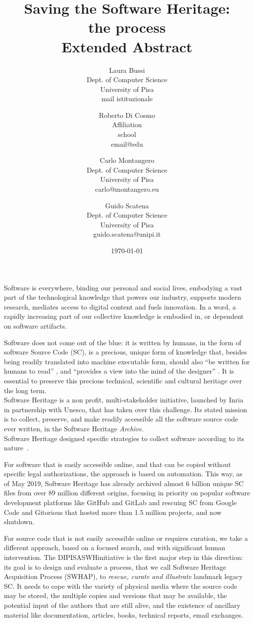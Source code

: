 \documentclass[a4paper]{article}
\title{Saving the Software Heritage:
				\\ the process  
				\\ 	\large Extended Abstract
}
\author{
    Laura Bussi\\
    Dept. of Computer Science\\
    University of Pisa\\
    mail istituzionale
	\and
    Roberto Di Cosmo\\
    Affiliation\\
    school\\
    email@edu
  \and
    Carlo Montangero\\
    Dept. of Computer Science\\
    University of Pisa\\
    carlo@montangero.eu
  \and
    Guido Scatena\\
		Dept. of Computer Science\\
    University of Pisa\\
    guido.scatena@unipi.it
}
\date{\today}
\newcommand{\DIPISASWHinitiative}{DIPISASWHinitiative }
\begin{document}
\maketitle

\noindent              
Software is everywhere,  binding our personal and social lives, embodying a vast part of the technological knowledge that powers our industry, supports modern research, mediates access to digital content and fuels innovation. In a word, a rapidly increasing part of our collective knowledge is embodied in, or dependent on software artifacts. 

Software does not come out of the blue: it is written by humans, in the form of software Source Code (SC), is a precious, unique form of knowledge that, besides being readily translated into machine executable form, should also "`be written for humans to read"' \cite{AbelsonS85}, and "`provides a view into the mind of the designer"' \cite{Shustek06}. It is essential to preserve this precious technical, scientific and cultural heritage over the long term.\\

\noindent
Software Heritage is a non profit, multi-stakeholder initiative, launched by Inria in partnership with Unesco, that has taken over this challenge. Its stated mission is to collect, preserve, and make readily accessible all the software source code ever written, in the Software Heritage \emph{Archive}.\\

Software Heritage designed specific strategies to collect software according to its nature~\cite{swhcacm2018}. 

For software that is easily accessible online, and that can be copied without specific legal authorizations, the approach is based on automation. This way, as of May 2019, Software Heritage has already archived almost 6 billion unique SC files from over 89 million different origins, focusing in priority on popular software development platforms like GitHub and GitLab and rescuing SC from Google Code and Gitorious that hosted more than 1.5 million projects, and now shutdown.

For source code that is not easily accessible online or requires curation, we take a different approach, based on a focused search, and with significant human intervention. The \DIPISASWHinitiative is the first major step in this direction: its goal is to design and evaluate a process, that we call Software Heritage Acquisition Process (SWHAP), to \emph{rescue, curate and illustrate} landmark legacy SC. It needs to cope with the variety of physical media where the source code may be stored, the multiple copies and versions that may be available, the potential input of the authors that are still alive, and the existence of ancillary material like documentation, articles, books, technical reports, email exchanges.\\
\end{document}
